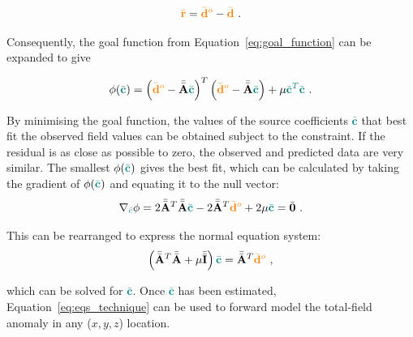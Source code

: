 \begin{equation}
    \label{eqs:resdiual}
    \textcolor{orange}{\bar{\mathbf{r}}} = \textcolor{orange}{\bar{\mathbf{d}}^o} - \textcolor{orange}{\bar{\mathbf{d}}}
    \ .
\end{equation}

\noindent
Consequently, the goal function from Equation~\ref{eq:goal_function} can  be expanded to give

\begin{equation}
    \phi (\textcolor{teal}{\bar{\mathbf{c}}}) = \left(\textcolor{orange}{\bar{\mathbf{d}}^o} - \Bar{\Bar{\mathbf{A}}} \textcolor{teal}{\bar{\mathbf{c}}}\right)^T \left(\textcolor{orange}{\bar{\mathbf{d}}^o} - \Bar{\Bar{\mathbf{A}}} \textcolor{teal}{\bar{\mathbf{c}}}\right) + \mu \textcolor{teal}{\bar{\mathbf{c}}^T\bar{\mathbf{c}}}
    \ .
\end{equation}

\noindent
By minimising the goal function, the values of the source coefficients \textcolor{teal}{$\bar{\mathbf{c}}$} that best fit the observed field values can be obtained subject to the constraint. If the residual is as close as possible to zero, the observed and predicted data are very similar. The smallest $\phi(\textcolor{teal}{\bar{\mathbf{c}}})$ gives the best fit, which can be calculated by taking the gradient of $\phi(\textcolor{teal}{\bar{\mathbf{c}}})$ and equating it to the null vector:
\begin{equation}
    \nabla_{\textcolor{teal}{\bar{c}}} \phi = 2 \Bar{\Bar{\mathbf{A}}}^T \Bar{\Bar{\mathbf{A}}} \textcolor{teal}{\Bar{\mathbf{c}}} - 2\Bar{\Bar{\mathbf{A}}}^T\textcolor{orange}{\bar{\mathbf{d}}^o} + 2\mu \textcolor{teal}{\bar{\mathbf{c}}} = \bar{\mathbf{0}}
    \ .
\end{equation}

\noindent
This can be rearranged to express the normal equation system:
\begin{equation}
    \left( \Bar{\Bar{\mathbf{A}}}^T \Bar{\Bar{\mathbf{A}}} +  \mu \bar{\bar{\mathbf{I}}} \right) \textcolor{teal}{\bar{\mathbf{c}}} =
    \Bar{\Bar{\mathbf{A}}}^T\textcolor{orange}{\bar{\mathbf{d}}^o}
    \ ,
    \label{eq:normal_equations}
\end{equation}

\noindent
which can be solved for \textcolor{teal}{$\bar{\mathbf{c}}$}. Once \textcolor{teal}{$\bar{\mathbf{c}}$} has been estimated, Equation~\ref{eq:eqs_technique} can be used to forward model the total-field anomaly in any ($x, y, z$) location.


